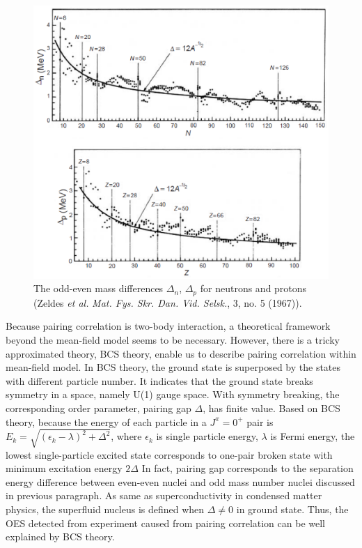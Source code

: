 \documentclass[11pt]{book} %
\begin{document}
\begin{figure}[tb]
 \begin{center}
    \includegraphics[width=120mm]{images/gap.eps}
 \end{center}
  \caption{The odd-even mass differences $\Delta_n$, $\Delta_p$ for neutrons and protons (Zeldes {\it et al.} {\it Mat. Fys. Skr. Dan. Vid. Selsk.}, 3, no. 5 (1967)).}
  \label{gap}
\end{figure}

Because pairing correlation is two-body interaction, a theoretical framework beyond the mean-field model seems to be necessary. However, there is a tricky approximated theory, BCS theory, enable us to describe pairing correlation within mean-field model. In BCS theory, the ground state is superposed by the states with different particle number. It indicates that the ground state breaks symmetry in a space, namely U(1) gauge space. With symmetry breaking, the corresponding order parameter, pairing gap $\Delta$, has finite value. Based on BCS theory, because the energy of each particle in a $J^{\pi}=0^+$ pair is $E_k=\sqrt{(\epsilon_k-\lambda)^2+\Delta^2}$, where $\epsilon_k$ is single particle energy, $\lambda$ is Fermi energy, the lowest single-particle excited state corresponds to one-pair broken state with minimum excitation energy $2\Delta$ In fact, pairing gap corresponds to the separation energy difference between even-even nuclei and odd mass number nuclei discussed in previous paragraph. As same as superconductivity in condensed matter physics, the superfluid nucleus is defined when $\Delta\neq0$ in ground state. Thus, the OES detected from experiment caused from pairing correlation can be well explained by BCS theory.
\end{document}
